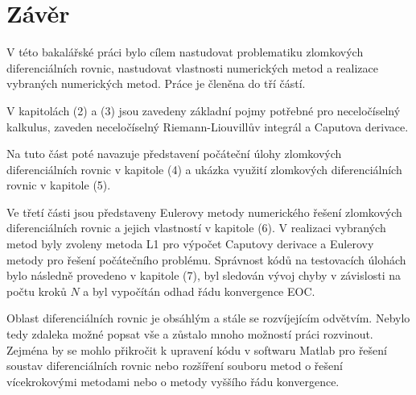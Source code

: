 \documentclass[a4paper,12pt,twoside]{article}
\theoremstyle{definition}
\theoremstyle{remark}
\numberwithin{equation}{section}
\numberwithin{table}{section}
\numberwithin{figure}{section}
\begin{document}
\begin{table}[h!]
\begin{tabular}{|c||cc|cc|cc|}
	\end{tabular}
\end{table}

\section{Závěr}
V této bakalářské práci bylo cílem nastudovat problematiku zlomkových diferenciálních rovnic, nastudovat vlastnosti numerických metod a realizace vybraných numerických metod. Práce je členěna do tří částí. 

V kapitolách (2) a (3) jsou zavedeny základní pojmy potřebné pro neceločíselný kalkulus, zaveden neceločíselný  Riemann-Liouvillův integrál a Caputova derivace. 

Na tuto část poté navazuje představení počáteční úlohy zlomkových diferenciálních rovnic v kapitole (4) a ukázka využití zlomkových diferenciálních rovnic v kapitole (5). 

Ve třetí části jsou představeny Eulerovy metody numerického řešení zlomkových diferenciálních rovnic a jejich vlastností v kapitole (6). V realizaci vybraných metod byly zvoleny metoda L1 pro výpočet Caputovy derivace a Eulerovy metody pro řešení počátečního problému. Správnost kódů na testovacích úlohách bylo následně provedeno v kapitole (7), byl sledován vývoj chyby v závislosti na počtu kroků $N$ a byl vypočítán odhad řádu konvergence EOC.

Oblast diferenciálních rovnic je obsáhlým a stále se rozvíjejícím odvětvím. Nebylo tedy zdaleka možné popsat vše a zůstalo mnoho možností práci rozvinout. Zejména by se mohlo přikročit k upravení kódu v softwaru Matlab pro řešení soustav diferenciálních rovnic nebo rozšíření souboru metod o řešení vícekrokovými metodami nebo o metody vyššího řádu konvergence.
\end{document}
